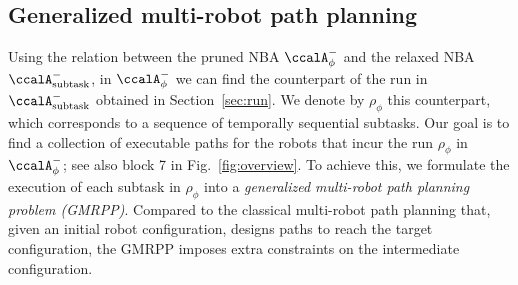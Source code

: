 \documentclass[Afour,sageh,times]{sagej}
\newtheorem{exmp}{Example}
\newcommand{\auto}[1]{\ccalA_{\textup{#1}}}
\newcommand{\autop}{\ccalA_{\phi}}
\newcommand{\vertex}[1]{v_{\textup{#1}}}
\newenvironment{cexmp}
{\addtocounter{exmp}{-1}\begin{exmp}}
  {\end{exmp}}
\begin{document}
{ %

 {\subsection{Generalized multi-robot path planning}\label{sec:mapp}
   Using  the relation between the pruned NBA  $\autop^-$ and the relaxed NBA $\auto{subtask}^-$, in $\autop^-$ we can find the counterpart  of the  run in $\auto{subtask}^-$ obtained in Section~\ref{sec:run}. We denote by $\rho_\phi$ this counterpart, which corresponds to  a sequence of temporally sequential subtasks. Our goal is to find a collection of executable paths for the robots that incur the run $\rho_\phi$ in $\autop^-$; see also block 7 in Fig.~\ref{fig:overview}. To achieve this, we formulate  the execution of each subtask in $\rho_\phi$ into a {\it generalized multi-robot path planning problem (GMRPP)}. Compared to the classical multi-robot path planning that, given an initial robot configuration, designs paths to reach the target configuration, the GMRPP imposes extra constraints on the intermediate configuration.

}}
\end{document}
